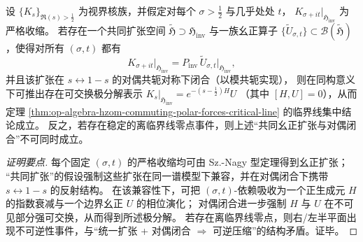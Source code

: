 \begin{proposition}\label{prop:op-algebra-common-unitary-dilation-criterion}
设 \(\{K_s\}_{\Re(s)>\tfrac12}\) 为视界核族，并假定对每个 \(\sigma>\tfrac12\) 与几乎处处 \(t\)，
\(
K_{\sigma+it}\big|_{\mathfrak{H}_{\mathrm{inv}}}
\)
为严格收缩。
若存在一个共同扩张空间 \(\widetilde{\mathfrak H}\supset\mathfrak{H}_{\mathrm{inv}}\) 与一族幺正算子 \(\{\widetilde U_{\sigma,t}\}\subset\mathcal{B}(\widetilde{\mathfrak H})\)，使得对所有 \((\sigma,t)\) 都有
\[
K_{\sigma+it}\big|_{\mathfrak{H}_{\mathrm{inv}}}
=P_{\mathrm{inv}}\,\widetilde U_{\sigma,t}\big|_{\mathfrak{H}_{\mathrm{inv}}},
\]
并且该扩张在 \(s\leftrightarrow 1-s\) 的对偶共轭对称下闭合（以模共轭实现），
则在同构意义下可推出存在可交换极分解表示
\(
K_s\big|_{\mathfrak{H}_{\mathrm{inv}}}=e^{-(s-\tfrac12)H}U
\)
（其中 \([H,U]=0\)），从而定理 \ref{thm:op-algebra-hzom-commuting-polar-forces-critical-line} 的临界线集中结论成立。
反之，若存在稳定的离临界线零点事件，则上述“共同幺正扩张与对偶闭合”不可同时成立。
\end{proposition}
\begin{proof}[证明要点]
每个固定 \((\sigma,t)\) 的严格收缩均可由 Sz.-Nagy 型定理得到幺正扩张；
“共同扩张”的假设强制这些扩张在同一谱模型下兼容，并在对偶闭合下携带 \(s\leftrightarrow 1-s\) 的反射结构。
在该兼容性下，可把 \((\sigma,t)\)-依赖吸收为一个正生成元 \(H\) 的指数衰减与一个边界幺正 \(U\) 的相位演化；
对偶闭合进一步强制 \(H\) 与 \(U\) 在不可见部分强可交换，从而得到所述极分解。
若存在离临界线零点，则右/左半平面出现不可逆性事件，与“统一扩张 + 对偶闭合 \(\Rightarrow\) 可逆压缩”的结构矛盾。证毕。
\end{proof}

